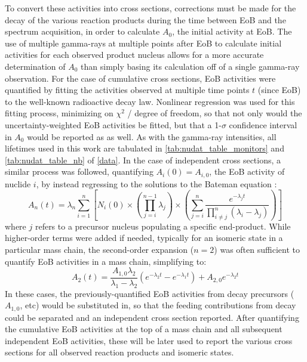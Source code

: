\documentclass[%
 reprint,
superscriptaddress,
onecolumn,
linenumbers,
notitlepage,
 amsmath,amssymb,
 aps,
prc,
]{revtex4-1}
\newcommand{\pp}[1]{\left( #1\right)}
\begin{document}
To convert these activities into cross sections, corrections must be made for the decay of the various reaction products during the time between EoB and the spectrum acquisition, in order to calculate $A_0$, the initial activity at EoB.
The use of  multiple gamma-rays at multiple points after EoB to calculate initial activities  for each observed product nucleus allows for a more accurate  determination of $A_0$ than simply basing its calculation off of a single gamma-ray observation.
For the case of cumulative cross sections, EoB activities were quantified by fitting the activities observed at multiple time points $t$ (since EoB) to the well-known radioactive decay law.
Nonlinear regression was used for this fitting process, minimizing on $\chi^2$ / degree of freedom, so that not only would the uncertainty-weighted EoB activities be fitted, but that a 1-$\sigma$ confidence interval in $A_0$ would be reported as as well.
As with the gamma-ray intensities, all lifetimes used in this work are tabulated in \autoref{tab:nudat_table_monitors} and \autoref{tab:nudat_table_nb} of \ref{data}.
In the case of independent cross sections, a similar process was followed, quantifying $A_i\pp{0} = A_{i,0}$, the EoB activity of nuclide $i$, by instead regressing to the solutions to the Bateman equation \cite{bateman1910solution,Cetnar2006}:
\begin{equation}
A_n\pp{t} = \lambda_n \sum_{i=1}^n \left[  N_i\pp{0} \times \pp{\prod_{j=i}^{n-1}\lambda_j} \times \pp{\sum_{j=i}^n \dfrac{e^{-\lambda_j t}}{\prod_{i\neq j}^n \pp{\lambda_i - \lambda_j}}  }   \right]
\end{equation}
where $j$ refers to a precursor nucleus populating a specific end-product.  
While higher-order terms were added if needed, typically for an isomeric state in a particular mass chain,  the second-order expansion ($n=2$) was often sufficient to quantify EoB activities in a mass chain, simplifying to:
\begin{equation}
A_2\pp{t} = \dfrac{A_{1,0}\lambda_2}{\lambda_1 - \lambda_2} \pp{e^{-\lambda_2 t} - e^{-\lambda_1 t}} + A_{2,0} e^{-\lambda_2 t}
\end{equation}
In these cases, the previously-quantified EoB activities from decay precursors ($A_{1,0}$, etc) would be substituted in, so that the feeding contributions from decay could be separated and an independent cross section reported.
After quantifying the cumulative EoB activities at the top of a mass chain and all subsequent independent EoB activities, these will be later used to report the various cross sections for all observed reaction products and isomeric states. 
\end{document}
